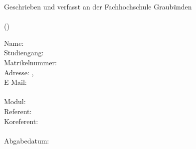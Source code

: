 \begin{titlepage}
    
    \begin{center}
        Geschrieben und verfasst an der Fachhochschule Graubünden\\
        \vspace{30mm}
        \huge\textbf{\haupttitel}\\
        \hfill \break
        \large{(\untertitel)}
    \end{center}
    
    \vfill
    
    \begin{flushleft}
    Name: \autorenschaft\\
    Studiengang: \studiengang\\
    Matrikelnummer: \matrikelnummer\\
    Adresse: \adresse, \plz~\ort\\
    E-Mail: \email\\
    ~\\
    Modul: \modul\\
    Referent: \\
    Koreferent: \coRefe\\
    ~\\
    Abgabedatum: \abgabedatum
    \end{flushleft}
    
    \vspace{20mm}
    
\end{titlepage}
